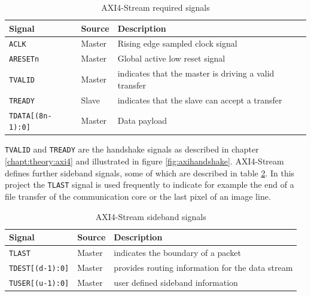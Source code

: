 \begin{table}[b!]
    \centering
    \begin{tabular}{ l  l l}
        \toprule
        Signal & Source & Description \\
        \midrule
        \texttt{ACLK} & Master & Rising edge sampled clock signal \\
        \texttt{ARESETn} & Master & Global active low reset signal \\
        \texttt{TVALID} & Master & indicates that the master is driving a valid transfer
        \\
        \texttt{TREADY} & Slave & indicates that the slave can accept a transfer \\
        \texttt{TDATA[(8n-1):0]} & Master & Data payload \\
        \bottomrule
    \end{tabular}
    \caption{AXI4-Stream required signals}
    \label{tab:axi4steramreqsig}
\end{table}

\texttt{TVALID} and \texttt{TREADY} are the handshake signals as described in chapter 
\ref{chapt:theory:axi4} and illustrated in figure \ref{fig:axihandshake}.
AXI4-Stream defines further sideband signals, some of which are described in
table \ref{tab:axi4steramside}. In this project the \texttt{TLAST} signal is
used frequently to indicate for example the end of a file transfer of the
communication core or the last pixel of an image line.

\begin{table}[b!]
    \centering
    \begin{tabular}{ l  l l}
        \toprule
        Signal & Source & Description \\
        \midrule
        \texttt{TLAST} & Master & indicates the boundary of a packet \\
        \texttt{TDEST[(d-1):0]} & Master & provides routing information for the data stream \\
        \texttt{TUSER[(u-1):0]} & Master & user defined sideband information \\
        \bottomrule
    \end{tabular}
    \caption{AXI4-Stream sideband signals}
    \label{tab:axi4steramside}
\end{table}



